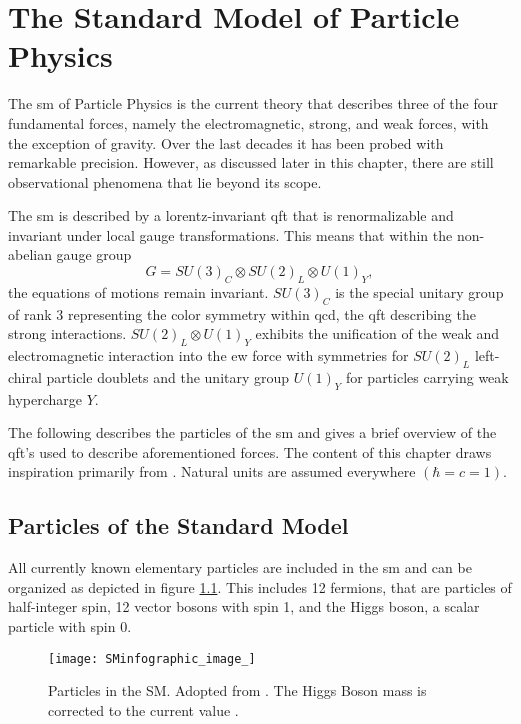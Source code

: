 \chapter{The Standard Model of Particle Physics}\label{ch:sm}
\noindent The \ac{sm} of Particle Physics is the current theory that describes three of the four fundamental forces, namely the electromagnetic, strong, and weak forces, with the exception of gravity. Over the last decades it has been probed with remarkable precision. However, as discussed later in this chapter, there are still observational phenomena that lie beyond its scope.

The \ac{sm} is described by a lorentz-invariant \ac{qft} that is renormalizable and invariant under local gauge transformations. This means that within the non-abelian gauge group
\begin{equation}
    G = SU(3)_C \otimes SU(2)_L \otimes U(1)_Y,
\end{equation}
the equations of motions remain invariant. $SU(3)_C$ is the special unitary group of rank 3 representing the color symmetry within \ac{qcd}, the \ac{qft} describing the strong interactions. $SU(2)_L \otimes U(1)_Y$ exhibits the unification of the weak and electromagnetic interaction into the \ac{ew} force with symmetries for $SU(2)_L$ left-chiral particle doublets and the unitary group $U(1)_Y$ for particles carrying weak hypercharge $Y$.

The following describes the particles of the \ac{sm} and gives a brief overview of the \ac{qft}'s used to describe aforementioned forces. The content of this chapter draws inspiration primarily from \citep{hollik2010quantum,griffiths2020introduction,thomson2013modern,zee2010quantum,halzen1984introductory}. Natural units are assumed everywhere $(\hbar=c=1)$.


\section{Particles of the Standard Model}

All currently known elementary particles are included in the \ac{sm} and can be organized as depicted in figure \ref{fig:sm}. This includes 12 fermions, that are particles of half-integer spin, 12 vector bosons with spin 1, and the Higgs boson, a scalar particle with spin 0.


\begin{figure}
    \centering
    \texttt{[image: SMinfographic\_image\_]}
    \caption[]{Particles in the SM. Adopted from \citep{smpar}. The Higgs Boson mass is corrected to the current value \citep{particle2022review}. }
    \label{fig:sm}
\end{figure}


